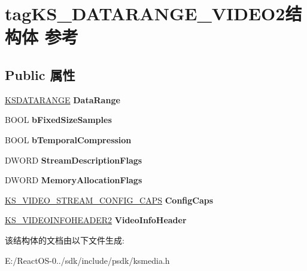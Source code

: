 \hypertarget{structtag_k_s___d_a_t_a_r_a_n_g_e___v_i_d_e_o2}{}\section{tag\+K\+S\+\_\+\+D\+A\+T\+A\+R\+A\+N\+G\+E\+\_\+\+V\+I\+D\+E\+O2结构体 参考}
\label{structtag_k_s___d_a_t_a_r_a_n_g_e___v_i_d_e_o2}
\subsection*{Public 属性}
\begin{DoxyCompactItemize}
\item 
\mbox{\label{structtag_k_s___d_a_t_a_r_a_n_g_e___v_i_d_e_o2_adf8201d04d2f86cbcb19876379434384}} 
\hyperlink{struct_k_s_d_a_t_a_f_o_r_m_a_t}{K\+S\+D\+A\+T\+A\+R\+A\+N\+GE} {\bfseries Data\+Range}
\item 
\mbox{\label{structtag_k_s___d_a_t_a_r_a_n_g_e___v_i_d_e_o2_a60e5b1e2ed28cecd2906e76975ff782c}} 
B\+O\+OL {\bfseries b\+Fixed\+Size\+Samples}
\item 
\mbox{\label{structtag_k_s___d_a_t_a_r_a_n_g_e___v_i_d_e_o2_aa8178b3a17c9cdac59d268d88e0415a4}} 
B\+O\+OL {\bfseries b\+Temporal\+Compression}
\item 
\mbox{\label{structtag_k_s___d_a_t_a_r_a_n_g_e___v_i_d_e_o2_a5417b1bfc198f166829228913633a1a6}} 
D\+W\+O\+RD {\bfseries Stream\+Description\+Flags}
\item 
\mbox{\label{structtag_k_s___d_a_t_a_r_a_n_g_e___v_i_d_e_o2_a054954e3f1f1e66d5556ed3b270b3f16}} 
D\+W\+O\+RD {\bfseries Memory\+Allocation\+Flags}
\item 
\mbox{\label{structtag_k_s___d_a_t_a_r_a_n_g_e___v_i_d_e_o2_a87fa1d28a2e0b429ddba42904fee8e66}} 
\hyperlink{struct___k_s___v_i_d_e_o___s_t_r_e_a_m___c_o_n_f_i_g___c_a_p_s}{K\+S\+\_\+\+V\+I\+D\+E\+O\+\_\+\+S\+T\+R\+E\+A\+M\+\_\+\+C\+O\+N\+F\+I\+G\+\_\+\+C\+A\+PS} {\bfseries Config\+Caps}
\item 
\mbox{\label{structtag_k_s___d_a_t_a_r_a_n_g_e___v_i_d_e_o2_ab7792921199be45e7619151a99a6620b}} 
\hyperlink{structtag_k_s___v_i_d_e_o_i_n_f_o_h_e_a_d_e_r2}{K\+S\+\_\+\+V\+I\+D\+E\+O\+I\+N\+F\+O\+H\+E\+A\+D\+E\+R2} {\bfseries Video\+Info\+Header}
\end{DoxyCompactItemize}


该结构体的文档由以下文件生成\+:\begin{DoxyCompactItemize}
\item 
E\+:/\+React\+O\+S-\/0../sdk/include/psdk/ksmedia.\+h\end{DoxyCompactItemize}
